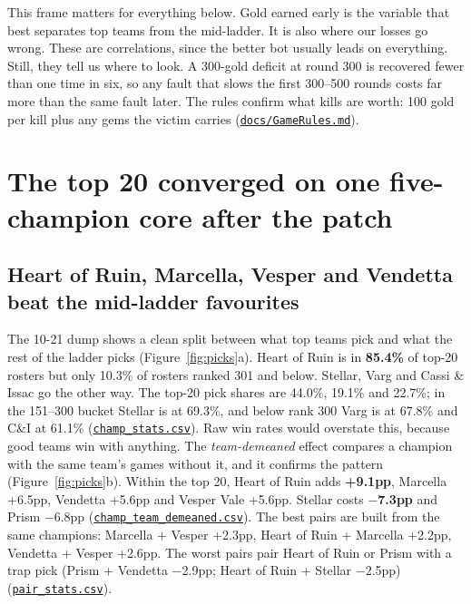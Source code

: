 \documentclass[11pt,a4paper]{article}
\newcommand{\scratch}{file:///private/tmp/claude-501/-Users-tristanbasri-Desktop-Code-cambridge-battlecode-s2/b3f4cb6b-e46a-405f-957c-42c44c05c8dc/scratchpad/ladder-data}
\newcommand{\repo}{file:///Users/tristanbasri/Desktop/Code/cambridge-battlecode-s2}
\newcommand{\src}[2]{{\small(\href{#1}{\textcolor{cTop}{\texttt{#2}}})}}
\newcommand{\CI}{C\&I}
\begin{document}
This frame matters for everything below. Gold earned early is the variable that best separates top teams from the mid-ladder. It is also where our losses go wrong. These are correlations, since the better bot usually leads on everything. Still, they tell us where to look. A 300-gold deficit at round 300 is recovered fewer than one time in six, so any fault that slows the first 300--500 rounds costs far more than the same fault later. The rules confirm what kills are worth: 100 gold per kill plus any gems the victim carries \src{\repo/docs/GameRules.md}{docs/GameRules.md}.

\section{The top 20 converged on one five-champion core after the patch}

\subsection{Heart of Ruin, Marcella, Vesper and Vendetta beat the mid-ladder favourites}

The 10-21 dump shows a clean split between what top teams pick and what the rest of the ladder picks (Figure~\ref{fig:picks}a). Heart of Ruin is in \textbf{85.4\%} of top-20 rosters but only 10.3\% of rosters ranked 301 and below. Stellar, Varg and Cassi \& Issac go the other way. The top-20 pick shares are 44.0\%, 19.1\% and 22.7\%; in the 151--300 bucket Stellar is at 69.3\%, and below rank 300 Varg is at 67.8\% and \CI{} at 61.1\% \src{\scratch/matchdb/out/champ_stats.csv}{champ\_stats.csv}. Raw win rates would overstate this, because good teams win with anything. The \emph{team-demeaned} effect compares a champion with the same team's games without it, and it confirms the pattern (Figure~\ref{fig:picks}b). Within the top 20, Heart of Ruin adds \textbf{+9.1pp}, Marcella +6.5pp, Vendetta +5.6pp and Vesper Vale +5.6pp. Stellar costs \textbf{$-$7.3pp} and Prism $-$6.8pp \src{\scratch/matchdb/out/champ_team_demeaned.csv}{champ\_team\_demeaned.csv}. The best pairs are built from the same champions: Marcella + Vesper +2.3pp, Heart of Ruin + Marcella +2.2pp, Vendetta + Vesper +2.6pp. The worst pairs pair Heart of Ruin or Prism with a trap pick (Prism + Vendetta $-$2.9pp; Heart of Ruin + Stellar $-$2.5pp) \src{\scratch/matchdb/out/pair_stats.csv}{pair\_stats.csv}.
\end{document}
